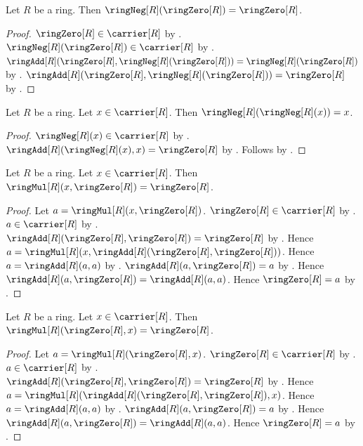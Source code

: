 \begin{proposition}\label{ring_neg_zero}
    Let $R$ be a ring.
    Then $\ringNeg[R](\ringZero[R])=\ringZero[R]$.
\end{proposition}
\begin{proof}
    $\ringZero[R]\in\carrier[R]$ by .
    $\ringNeg[R](\ringZero[R])\in\carrier[R]$
        by .
    $\ringAdd[R](\ringZero[R],\ringNeg[R](\ringZero[R]))
        =\ringNeg[R](\ringZero[R])$
        by .
    $\ringAdd[R](\ringZero[R],\ringNeg[R](\ringZero[R]))
        =\ringZero[R]$
        by .
\end{proof}

\begin{theorem}\label{ring_neg_involutive}
    Let $R$ be a ring.
    Let $x\in\carrier[R]$.
    Then $\ringNeg[R](\ringNeg[R](x))=x$.
\end{theorem}
\begin{proof}
    $\ringNeg[R](x)\in\carrier[R]$ by .
    $\ringAdd[R](\ringNeg[R](x),x)=\ringZero[R]$
        by .
    Follows by .
\end{proof}

\begin{theorem}\label{ring_mul_zero_right}
    Let $R$ be a ring.
    Let $x\in\carrier[R]$.
    Then $\ringMul[R](x,\ringZero[R])=\ringZero[R]$.
\end{theorem}
\begin{proof}
    Let $a=\ringMul[R](x,\ringZero[R])$.
    $\ringZero[R]\in\carrier[R]$ by .
    $a\in\carrier[R]$ by .
    $\ringAdd[R](\ringZero[R],\ringZero[R])=\ringZero[R]$
        by .
    Hence $a=\ringMul[R]
        (x,\ringAdd[R](\ringZero[R],\ringZero[R]))$.
    Hence $a=\ringAdd[R](a,a)$
        by .
    $\ringAdd[R](a,\ringZero[R])=a$
        by .
    Hence
        $\ringAdd[R](a,\ringZero[R])=\ringAdd[R](a,a)$.
    Hence $\ringZero[R]=a$ by .
\end{proof}

\begin{theorem}\label{ring_mul_zero_left}
    Let $R$ be a ring.
    Let $x\in\carrier[R]$.
    Then $\ringMul[R](\ringZero[R],x)=\ringZero[R]$.
\end{theorem}
\begin{proof}
    Let $a=\ringMul[R](\ringZero[R],x)$.
    $\ringZero[R]\in\carrier[R]$ by .
    $a\in\carrier[R]$ by .
    $\ringAdd[R](\ringZero[R],\ringZero[R])=\ringZero[R]$
        by .
    Hence $a=\ringMul[R]
        (\ringAdd[R](\ringZero[R],\ringZero[R]),x)$.
    Hence $a=\ringAdd[R](a,a)$
        by .
    $\ringAdd[R](a,\ringZero[R])=a$
        by .
    Hence
        $\ringAdd[R](a,\ringZero[R])=\ringAdd[R](a,a)$.
    Hence $\ringZero[R]=a$ by .
\end{proof}

